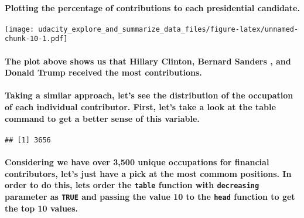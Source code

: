 \documentclass[]{article}
\let\oldparagraph\paragraph
\renewcommand{\paragraph}[1]{\oldparagraph{#1}\mbox{}}
\begin{document}
\paragraph{Plotting the percentage of contributions to each presidential
candidate.}\label{plotting-the-percentage-of-contributions-to-each-presidential-candidate.}

\texttt{[image: udacity\_explore\_and\_summarize\_data\_files/figure-latex/unnamed-chunk-10-1.pdf]}

\paragraph{\texorpdfstring{The plot above shows us that Hillary Clinton,
Bernard Sanders , and Donald Trump received the most
contributions.}{The plot above shows us that Hillary Clinton,  Bernard Sanders , and Donald Trump received the most contributions.}}\label{the-plot-above-shows-us-that-hillary-clinton-bernard-sanders-and-donald-trump-received-the-most-contributions.}

\paragraph{Taking a similar approach, let's see the distribution of the
occupation of each individual contributor. First, let's take a look at
the table command to get a better sense of this
variable.}\label{taking-a-similar-approach-lets-see-the-distribution-of-the-occupation-of-each-individual-contributor.-first-lets-take-a-look-at-the-table-command-to-get-a-better-sense-of-this-variable.}

\begin{verbatim}
## [1] 3656
\end{verbatim}

\paragraph{\texorpdfstring{Considering we have over 3,500 unique
occupations for financial contributors, let's just have a pick at the
most commom positions. In order to do this, lets order the
\texttt{table} function with \texttt{decreasing} parameter as
\texttt{TRUE} and passing the value 10 to the \texttt{head} function to
get the top 10
values.}{Considering we have over 3,500 unique occupations for financial contributors, let's just have a pick at the most commom positions. In order to do this, lets order the table function with decreasing parameter as TRUE and passing the value 10 to the head function to get the top 10 values.}}\label{considering-we-have-over-3500-unique-occupations-for-financial-contributors-lets-just-have-a-pick-at-the-most-commom-positions.-in-order-to-do-this-lets-order-the-table-function-with-decreasing-parameter-as-true-and-passing-the-value-10-to-the-head-function-to-get-the-top-10-values.}
\end{document}
